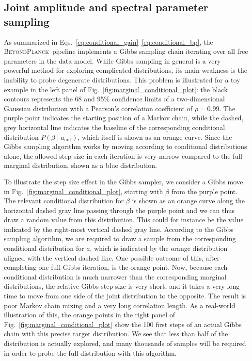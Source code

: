 \documentclass{aa}
\def\,{\thinspace}
\newcommand{\BP}{\textsc{BeyondPlanck}}
\begin{document}
\subsection{Joint amplitude and spectral parameter sampling}
\label{subsec:gibbs}

As summarized in
Eqs.~\eqref{eq:conditional_gain}--\eqref{eq:conditional_bp}, the
\BP\ pipeline implements a Gibbs sampling chain iterating over all
free parameters in the data model. While Gibbs sampling in general is
a very powerful method for exploring complicated distributions, its
main weakness is the inability to probe degenerate distributions. This
problem is illustrated for a toy example in the left panel of
Fig.~\ref{fig:marginal_conditional_plot}: the black contours
represents the 68 and 95\,\% confidence limits of a two-dimensional
Gaussian distribution with a Pearson's correlation coefficient of
$\rho=0.99$. The purple point indicates the starting position of a
Markov chain, while the dashed, grey horizontal line indicates the baseline
of the corresponding conditional distribution
$P(\beta\mid a_{\mathrm{init}})$, which itself is shown as an orange
curve. Since the Gibbs sampling algorithm works by moving according to
conditional distributions alone, the allowed step size in each
iteration is very narrow compared to the full marginal distribution,
shown as a blue distribution.

To illustrate the step size effect in the Gibbs sampler, we consider a Gibbs move in Fig.~\ref{fig:marginal_conditional_plot},
starting with $\beta$ from the purple point. The
relevant conditional distribution for $\beta$ is shown as an orange curve
along the horizontal dashed gray line passing through the purple
point and we can thus draw a random value from this distribution. This
could for instance be the value indicated by the right-most vertical
dashed gray line. According to the Gibbs sampling algorithm, we are required to draw a sample from the corresponding conditional
distribution for $a$, which is indicated by the orange distribution
aligned with the vertical dashed line. One possible outcome of this,
after completing one full Gibbs iteration, is the orange point. Now,
because each conditional distribution is much narrower than the
corresponding marginal distributions, the relative Gibbs step size is
very short, and it takes a very long time to move from one side of the
joint distribution to the opposite. The result is poor Markov chain
mixing and a very long correlation length. As a real-world
illustration of this, the orange points in the right panel of
Fig.~\ref{fig:marginal_conditional_plot} show the 100 first steps of
an actual Gibbs chain with this precise target distribution. We see
that less than half of the distribution is actually explored, and many
thousands of samples will be required in order to probe the full
distribution with this algorithm.
\end{document}
